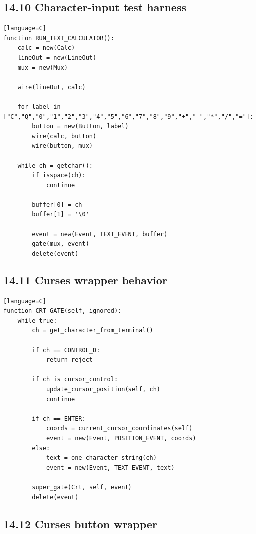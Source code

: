 \documentclass[11pt]{article}
\begin{document}
\subsection{14.10 Character-input test
harness}\label{character-input-test-harness}

\begin{verbatim}[language=C]
function RUN_TEXT_CALCULATOR():
    calc = new(Calc)
    lineOut = new(LineOut)
    mux = new(Mux)

    wire(lineOut, calc)

    for label in ["C","Q","0","1","2","3","4","5","6","7","8","9","+","-","*","/","="]:
        button = new(Button, label)
        wire(calc, button)
        wire(button, mux)

    while ch = getchar():
        if isspace(ch):
            continue

        buffer[0] = ch
        buffer[1] = '\0'

        event = new(Event, TEXT_EVENT, buffer)
        gate(mux, event)
        delete(event)
\end{verbatim}

\subsection{14.11 Curses wrapper
behavior}\label{curses-wrapper-behavior}

\begin{verbatim}[language=C]
function CRT_GATE(self, ignored):
    while true:
        ch = get_character_from_terminal()

        if ch == CONTROL_D:
            return reject

        if ch is cursor_control:
            update_cursor_position(self, ch)
            continue

        if ch == ENTER:
            coords = current_cursor_coordinates(self)
            event = new(Event, POSITION_EVENT, coords)
        else:
            text = one_character_string(ch)
            event = new(Event, TEXT_EVENT, text)

        super_gate(Crt, self, event)
        delete(event)
\end{verbatim}

\subsection{14.12 Curses button wrapper}\label{curses-button-wrapper}
\end{document}

